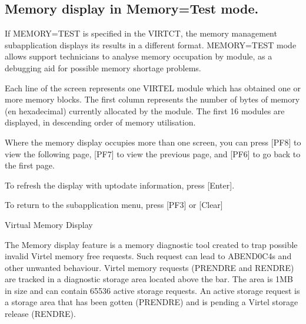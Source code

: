 \documentclass[letterpaper,10pt,english]{sphinxmanual}
\begin{document}
\ignorespaces 

\subsection{Memory display in Memory=Test mode.}
\label{\detokenize{audit_operations_ and_performance:memory-display-in-memory-test-mode}}\label{\detokenize{audit_operations_ and_performance:index-41}}
\sphinxAtStartPar
If MEMORY=TEST is specified in the VIRTCT, the memory management sub\sphinxhyphen{}application displays its results in a different format. MEMORY=TEST mode allows support technicians to analyse memory occupation by module, as a debugging aid for possible memory shortage problems.

\sphinxAtStartPar
{}

\sphinxAtStartPar
{}

\sphinxAtStartPar
Each line of the screen represents one VIRTEL module which has obtained one or more memory blocks. The first column represents the number of bytes of memory (en hexadecimal) currently allocated by the module. The first 16 modules are displayed, in descending order of memory utilisation.

\sphinxAtStartPar
Where the memory display occupies more than one screen, you can press {[}PF8{]} to view the following page, {[}PF7{]} to view the previous page, and {[}PF6{]} to go back to the first page.

\sphinxAtStartPar
To refresh the display with up\sphinxhyphen{}to\sphinxhyphen{}date information, press {[}Enter{]}.

\sphinxAtStartPar
To return to the sub\sphinxhyphen{}application menu, press {[}PF3{]} or {[}Clear{]}

 Virtual Memory Display

\sphinxAtStartPar
The Memory display feature is a memory diagnostic tool created to trap possible invalid Virtel memory free requests. Such request can lead to ABEND0C4s and other unwanted behaviour. Virtel memory requests (PRENDRE and RENDRE) are tracked in a diagnostic storage area located above the bar. The area is 1MB in size and can contain 65536 active storage requests. An active storage request is a storage area that has been gotten (PRENDRE) and is pending a Virtel storage release (RENDRE).
\end{document}
